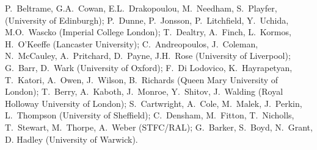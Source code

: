 
P.\ Beltrame, 
G.A.\ Cowan, 
E.L.\ Drakopoulou,
M.\ Needham, 
S.\ Playfer, 
(University of Edinburgh); 
P.\ Dunne,
P.\ Jonsson,
P.\ Litchfield,
Y.\ Uchida, 
M.O.\ Wascko 
(Imperial College London); 
T.\ Dealtry, 
A.\ Finch, 
L.\ Kormos, 
H.\ O'Keeffe 
(Lancaster University);
C.\ Andreopoulos, 
J.\ Coleman,
N.\ McCauley,
A.\ Pritchard, 
D.\ Payne, 
J.H.\ Rose 
(University of Liverpool); 
G.\ Barr, 
D.\ Wark 
(University of Oxford); 
F.\ Di Lodovico, 
K.\ Hayrapetyan,
T.\ Katori,
A.\ Owen, 
J.\ Wilson,
B.\ Richards 
 (Queen Mary University of London); 
T.\ Berry, 
A.\ Kaboth,
J.\ Monroe,
Y.\ Shitov,
J.\ Walding
(Royal Holloway University of London);
S.\ Cartwright, 
A.\ Cole,
M.\ Malek, 
J.\ Perkin, 
L.\ Thompson (University of Sheffield); 
C.\ Densham, 
M.\ Fitton, 
T.\ Nicholls, 
T.\ Stewart, 
M.\ Thorpe, 
A.\ Weber  
(STFC/RAL); 
G.\ Barker, 
S.\ Boyd,
N.\ Grant, 
D. Hadley (University of Warwick).
